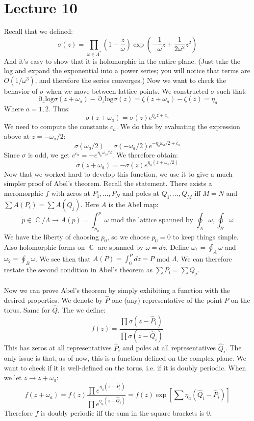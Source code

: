 \documentclass[12 pt]{article}
\DeclareMathOperator {\p} {\partial}
\DeclareMathOperator {\C} {\mathbb{C}}
\theoremstyle{plain}
\theoremstyle{definition}
\theoremstyle{remark}
\begin{document}
\section*{Lecture 10}
Recall that we defined:
\[     \sigma(z) = \prod_{\omega \in \Lambda^*} \left(1 + \frac{z}{\omega} \right)  \exp \left( - \frac{1}{\omega} z + \frac{1}{2\omega^2} z^2  \right)     \]
And it's easy to show that it is holomorphic in the entire plane. (Just take the log and expand the exponential into a power series; you will notice that terms are $O(1/\omega^3)$, and therefore the series converges.) Now we want to check the behavior of $\sigma$ when we move between lattice points. We constructed $\sigma$ such that:
\[      \p_z \text{log} \sigma(z+\omega_a) - \p_z \text{log} \sigma(z) = \zeta(z + \omega_a) - \zeta(z) = \eta_a  \]
Where $a = 1,2$. Thus:
\[  \sigma(z + \omega_a) = \sigma(z) e^{\eta_a z + c_a}   \]
We need to compute the constants $c_a$. We do this by evaluating the expression above at $z = - \omega_a/2$:
\[      \sigma(\omega_a/2) = \sigma(-\omega_a/2) e^{- \eta_a \omega_a /2 + c_a}    \]
Since $\sigma$ is odd, we get $e^{c_a} = - e^{\eta_a \omega_a /2}$. We therefore obtain:
\[     \sigma(z + \omega_a) = - \sigma(z) e^{\eta_a( z + \omega_a/2)}    \]
Now that we worked hard to develop this function, we use it to give a much simpler proof of Abel's theorem. Recall the statement. There exists a meromorphic $f$ with zeros at $P_1, \dots, P_N$ and poles at $Q_1, \dots, Q_M$ iff $M=N$ and $\sum A(P_i) = \sum A(Q_j)$. Here $A$ is the Abel map:
\[       p \in \C/\Lambda \to A(p) = \int_{p_0}^p \omega  \text{ mod the lattice spanned by } \oint_A \omega, \oint_B \omega     \]
We have the liberty of choosing $p_0$, so we choose $p_0 = 0$ to keep things simple. Also holomorphic forms on $\C$ are spanned by $\omega = dz$. Define $\omega_1 = \oint_A \omega$ and $\omega_2 = \oint_B \omega$. We see then that $A(P) = \int_0^P dz = P$ mod $\Lambda$. We can therefore restate the second condition in Abel's theorem as $\sum P_i = \sum Q_j$.
\\
\\
Now we can prove Abel's theorem by simply exhibiting a function with the desired properties. We denote by $\hat P$ one (any) representative of the point $P$ on the torus. Same for $\hat Q$. The we define:
\[    f(z) = \frac{\prod \sigma(z - \hat P_i)}{\prod \sigma(z - \hat Q_i) }     \]
This has zeros at all representatives $\hat P_i$ and poles at all representatives $\hat Q_i$. The only issue is that, as of now, this is a function defined on the complex plane. We want to check if it is well-defined on the torus, i.e. if it is doubly periodic. When we let $z \to z + \omega_a$:
\[     f(z + \omega_a) = f(z)  \frac{\prod e^{\eta_a (z - \hat P_i)}}{\prod e^{\eta_a (z - \hat Q_i)}} = f(z) \exp \left[ \sum \eta_a (\hat Q_i - \hat P_i)  \right]    \]
Therefore $f$ is doubly periodic iff the sum in the square brackets is 0.
\end{document}
